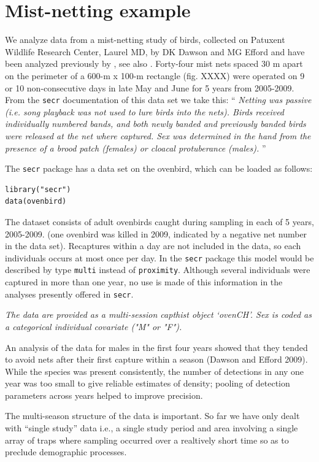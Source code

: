 \section{Mist-netting example}

We analyze data from  a mist-netting study of
birds, collected on
Patuxent Wildlife Research Center, Laurel MD, 
by DK Dawson and MG Efford and have been analyzed previously 
by \citet{efford_etal:2004}, see also \citet{borchers_efford:2008}.
Forty-four mist nets spaced 30 m apart on the
perimeter of a 600-m x 100-m rectangle (fig. XXXX)  were operated
on 9 or 10 non-consecutive days in late May and June for 5 years from 2005-2009.
From 
 the \mbox{\tt secr} documentation of this data set we take this:
``{\it
Netting was passive (i.e. song playback was not used to lure birds
into the nets). Birds received individually numbered bands, and both
newly banded and previously banded birds were released at the net
where captured. Sex was determined in the hand from the presence of a
brood patch (females) or cloacal protuberance (males).
}''

The \mbox{\tt secr} package has a data set on the ovenbird, which can
be loaded as follows:
\begin{verbatim}
library("secr")
data(ovenbird)
\end{verbatim}
The dataset consists of adult ovenbirds caught during sampling in each
of 5 years, 2005-2009. (one ovenbird was killed in 2009, indicated by
a negative net number in the data set).  Recaptures within a day are
not included in the data, so each individuals occurs at most once per
day. In the \mbox{\tt secr} package this model would be described by
type \mbox{\tt multi} instead of \mbox{\tt proximity}.  Although
several individuals were captured in more than one year, no use is
made of this information in the analyses presently offered in
\mbox{\tt secr}.

{\it The data are provided as a multi-session capthist object ‘ovenCH’. Sex is coded as a categorical individual covariate ("M" or "F").

An analysis of the data for males in the first four years showed that they tended to avoid nets after their first capture within a season (Dawson and Efford 2009). While the species was present consistently, the number of detections in any one year was too small to give reliable estimates of density; pooling of detection parameters across years helped to improve precision.
}

The multi-season structure of the data is important. 
So far we have only dealt with ``single study'' data i.e., a single
study period and area involving a single array of traps where sampling
occurred over a realtively short time so as to preclude demographic
processes.

